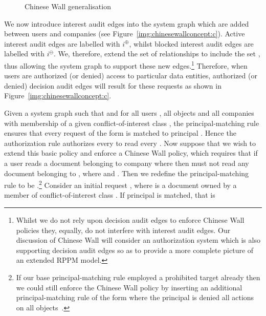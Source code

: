 \documentclass{article}
\newcommand{\auditd}[1]{\ensuremath{#1^\ominus}}
\newcommand{\interesta}{\ensuremath{i^\oplus}}
\newcommand{\interestb}{\ensuremath{i^\ominus}}
\begin{document}
\begin{figure}[!ht]
{
        \label{img:chinesewallconcept:c}
    }
    \caption{Chinese Wall generalisation}\label{img:chinesewallconcept}
\end{figure}


We now introduce interest audit edges into the system graph which are added between users and companies (see Figure~\ref{img:chinesewallconcept:c}).
Active interest audit edges are labelled with \interesta, whilst blocked interest audit edges are labelled with \interestb.
We, therefore, extend the set of relationships  to include the set , thus allowing the system graph to support these new edges.\footnote{Whilst we do not rely upon decision audit edges to enforce Chinese Wall policies they, equally, do not interfere with interest audit edges.
Our discussion of Chinese Wall will consider an authorization system which is also supporting decision audit edges so as to provide a more complete picture of an extended RPPM model.}
Therefore, when users are authorized (or denied) access to particular data entities, authorized (or denied) decision audit edges will result for these requests as shown in Figure~\ref{img:chinesewallconcept:c}.

Given a system graph  such that  and  for all users , all objects  and all companies  with membership of a given conflict-of-interest class , the principal-matching rule  ensures that every request of the form  is matched to principal .
Hence the authorization rule  authorizes every  to read every .
Now suppose that we wish to extend this basic policy and enforce a Chinese Wall policy, which requires that if a user  reads a document belonging to company  where  then  must not read any document belonging to , where  and .
Then we redefine the principal-matching rule to be .\footnote{If our base principal-matching rule employed a prohibited target already then we could still enforce the Chinese Wall policy by inserting an additional principal-matching rule of the form  where the principal  is denied all actions on all objects~\cite{CramptonS14_STM}.}
Consider an initial request , where  is a document owned by  a member of conflict-of-interest class .
If principal  is matched, that is
\end{document}
